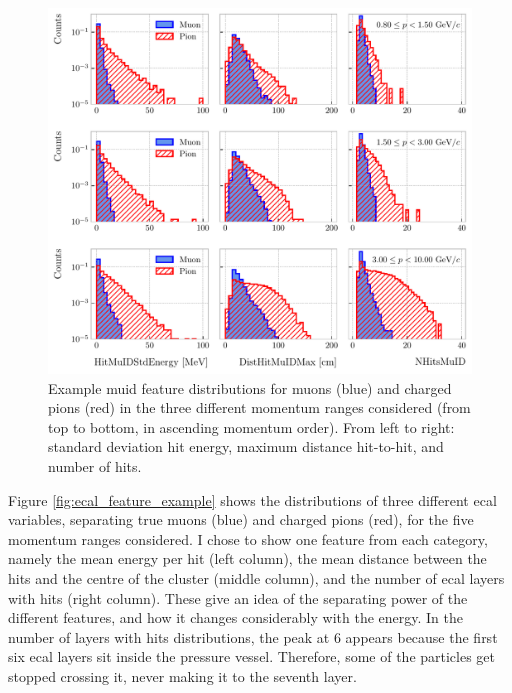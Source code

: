\begin{figure}[t]
	\centering
	\includegraphics[width=.95\linewidth]{Images/GArSoft_PID/BDT/muid_feature_distribution_all_example.pdf}
	\caption[Example \gls{muid} feature distributions for muons and charged pions in the three different momentum ranges considered.]{Example \gls{muid} feature distributions for muons (blue) and charged pions (red) in the three different momentum ranges considered (from top to bottom, in ascending momentum order). From left to right: standard deviation hit energy, maximum distance hit-to-hit, and number of hits.}
	\label{fig:muid_feature_example}
\end{figure}

Figure \ref{fig:ecal_feature_example} shows the distributions of three different \gls{ecal} variables, separating true muons (blue) and charged pions (red), for the five momentum ranges considered. I chose to show one feature from each category, namely the mean energy per hit (left column), the mean distance between the hits and the centre of the cluster (middle column), and the number of \gls{ecal} layers with hits (right column). These give an idea of the separating power of the different features, and how it changes considerably with the energy. In the number of layers with hits distributions, the peak at $6$ appears because the first six \gls{ecal} layers sit inside the pressure vessel. Therefore, some of the particles get stopped crossing it, never making it to the seventh layer.


